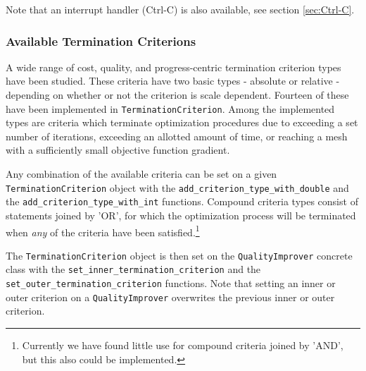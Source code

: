 Note that an interrupt handler (Ctrl-C) is also available, see section \ref{sec:Ctrl-C}. 

\subsubsection{Available Termination Criterions}
A wide range of cost, quality, 
and progress-centric termination
criterion types have been studied. These criteria have two basic types - 
absolute or relative - depending on whether or not the criterion is scale 
dependent.  Fourteen of these have been
implemented in \texttt{TerminationCriterion}.  Among the implemented
types are criteria which terminate optimization procedures due to
exceeding a set number of iterations, exceeding an allotted amount of
time, or reaching a mesh with a sufficiently small objective function
gradient.  

Any combination of the available criteria can be set on a given
\texttt{TerminationCriterion} object with the \texttt{add\_criterion\_type\_with\_double} and 
the \texttt{add\_criterion\_type\_with\_int} functions.  Compound criteria types consist
of statements joined by 'OR', for which 
the optimization process will be terminated when {\it any} of
the criteria have been satisfied.\footnote{Currently we have found little use
for compound criteria joined by 'AND', but this also could be implemented.}

The \texttt{TerminationCriterion} object is then set on the \texttt{QualityImprover} concrete class
with the \texttt{set\_inner\_termination\_criterion} and the \texttt{set\_outer\_termination\_criterion}
functions. Note that setting an inner or outer criterion on a \texttt{QualityImprover} overwrites
the previous inner or outer criterion.

